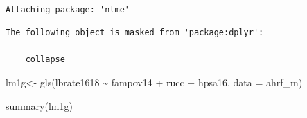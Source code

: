 \documentclass[
  letterpaper,
  DIV=11,
  numbers=noendperiod]{scrreprt}
\newenvironment{Shaded}{\begin{snugshade}}{\end{snugshade}}
\newcommand{\AttributeTok}[1]{\textcolor[rgb]{0.40,0.45,0.13}{#1}}
\newcommand{\FunctionTok}[1]{\textcolor[rgb]{0.28,0.35,0.67}{#1}}
\newcommand{\NormalTok}[1]{\textcolor[rgb]{0.00,0.23,0.31}{#1}}
\newcommand{\OtherTok}[1]{\textcolor[rgb]{0.00,0.23,0.31}{#1}}
\newcommand{\SpecialCharTok}[1]{\textcolor[rgb]{0.37,0.37,0.37}{#1}}
\begin{document}
\begin{verbatim}

Attaching package: 'nlme'
\end{verbatim}

\begin{verbatim}
The following object is masked from 'package:dplyr':

    collapse
\end{verbatim}

\begin{Shaded}
\begin{Highlighting}[]
\NormalTok{lm1g}\OtherTok{\textless{}{-}} \FunctionTok{gls}\NormalTok{(lbrate1618 }\SpecialCharTok{\textasciitilde{}}\NormalTok{  fampov14 }\SpecialCharTok{+}\NormalTok{ rucc }\SpecialCharTok{+}\NormalTok{ hpsa16,}
          \AttributeTok{data =}\NormalTok{ ahrf\_m)}

\FunctionTok{summary}\NormalTok{(lm1g)}
\end{Highlighting}
\end{Shaded}
\end{document}
